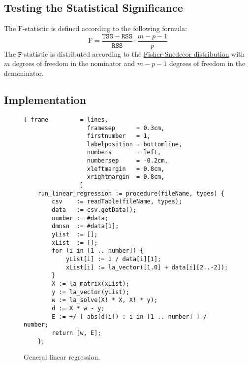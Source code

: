\subsection{Testing the Statistical Significance}
The $\mathrm{F}$-statistic is defined according to the following formula:
\begin{equation}
  \label{eq:F-statistic}
  \mathrm{F} = \frac{\mathtt{TSS} - \mathtt{RSS}}{\mathtt{RSS}} \cdot \frac{m - p - 1}{p}
\end{equation}
The $\mathtt{F}$-statistic is distributed according to the
\href{https://en.wikipedia.org/wiki/F-distribution}{Fisher-Snedecor-distribution} with $m$ degrees of freedom
in the nominator and $m - p - 1$ degrees of freedom in the denominator. 

\subsection{Implementation}
\begin{figure}[!ht]
\centering
\begin{Verbatim}[ frame         = lines, 
                  framesep      = 0.3cm, 
                  firstnumber   = 1,
                  labelposition = bottomline,
                  numbers       = left,
                  numbersep     = -0.2cm,
                  xleftmargin   = 0.8cm,
                  xrightmargin  = 0.8cm,
                ]
    run_linear_regression := procedure(fileName, types) {
        csv    := readTable(fileName, types);
        data   := csv.getData();
        number := #data;
        dmnsn  := #data[1];    
        yList  := [];
        xList  := [];
        for (i in [1 .. number]) {
            yList[i] := 1 / data[i][1];
            xList[i] := la_vector([1.0] + data[i][2..-2]);
        }
        X := la_matrix(xList);
        y := la_vector(yList);
        w := la_solve(X! * X, X! * y);
        d := X * w - y;
        E := +/ [ abs(d[i]) : i in [1 .. number] ] / number;
        return [w, E];
    };
\end{Verbatim}
\vspace*{-0.3cm}
\caption{General linear regression.}
\label{fig:linear-regression.stlx}
\end{figure}


